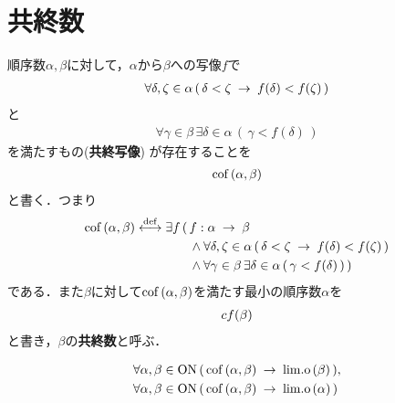 \section{共終数}
	順序数$\alpha,\beta$に対して，$\alpha$から$\beta$への写像$f$で
	\begin{align}
		\forall \delta,\zeta \in \alpha\, (\, \delta < \zeta \hspace{0.25em}\rightarrow\hspace{0.25em} f(\delta) < f(\zeta)\, )
	\end{align}
	と
	\begin{align}
		\forall \gamma \in \beta\, \exists \delta \in \alpha\, (\, \gamma < f(\delta)\, )
	\end{align}
	を満たすもの({\bf 共終写像})
	が存在することを
	\begin{align}
		\operatorname*{cof}\hspace{0.15em}(\alpha,\beta)
	\end{align}
	と書く．つまり
	\begin{align}
		\operatorname*{cof}\hspace{0.15em}(\alpha,\beta) \overset{\mathrm{def}}{\longleftrightarrow}
		\exists f\, (\, &f:\alpha \hspace{0.25em}\rightarrow\hspace{0.25em} \beta \\
		&\wedge \forall \delta,\zeta \in \alpha\, (\, \delta < \zeta \hspace{0.25em}\rightarrow\hspace{0.25em} f(\delta) < f(\zeta)\, ) \\
		&\wedge \forall \gamma \in \beta\, \exists \delta \in \alpha\, (\, \gamma < f(\delta)\, )
		 \, )
	\end{align}
	である．また$\beta$に対して$\operatorname*{cof}\hspace{0.15em}(\alpha,\beta)$を満たす最小の順序数$\alpha$を
	\begin{align}
		cf(\beta)
	\end{align}
	と書き，$\beta$の{\bf 共終数}と呼ぶ．
	
	\begin{screen}
		\begin{thm}[共終の概念は極限数のみに使われる]
			\begin{align}
				&\forall \alpha,\beta \in \mathrm{ON}\, 
				(\, \operatorname*{cof}\hspace{0.15em}(\alpha,\beta) \hspace{0.25em}\rightarrow\hspace{0.25em} \mathrm{lim.o}\hspace{0.15em}(\beta)\, ), \\
				&\forall \alpha,\beta \in \mathrm{ON}\, 
				(\, \operatorname*{cof}\hspace{0.15em}(\alpha,\beta) \hspace{0.25em}\rightarrow\hspace{0.25em} \mathrm{lim.o}\hspace{0.15em}(\alpha)\, )
			\end{align}
		\end{thm}
	\end{screen}
	
